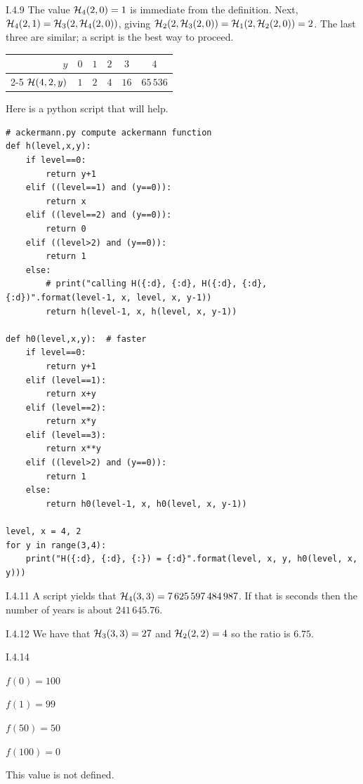 \begin{ans}{I.4.9}
The value $\mathcal{H}_4(2,0)=1$ is immediate from the
definition.
Next, $\mathcal{H}_4(2,1)=\mathcal{H}_3(2,\mathcal{H}_4(2,0))$,
giving $\mathcal{H}_2(2,\mathcal{H}_3(2,0))=\mathcal{H}_1(2,\mathcal{H}_2(2,0))=2$.
The last three are similar; a script is the best way to proceed.
\begin{center}
\begin{tabular}{r|ccccc}
  $y$                       &$0$  &$1$  &$2$  &$3$   &$4$ \\  \cline{2-5}
  $\mathcal{H}(4,2,y)$ &$1$  &$2$  &$4$  &$16$  &$65\,536$
\end{tabular}
\end{center}
Here is a python script that will help.
\begin{lstlisting}
# ackermann.py compute ackermann function
def h(level,x,y):
    if level==0:
        return y+1
    elif ((level==1) and (y==0)):
        return x
    elif ((level==2) and (y==0)):
        return 0
    elif ((level>2) and (y==0)):
        return 1
    else:
        # print("calling H({:d}, {:d}, H({:d}, {:d}, {:d})".format(level-1, x, level, x, y-1))
        return h(level-1, x, h(level, x, y-1))

def h0(level,x,y):  # faster
    if level==0:
        return y+1
    elif (level==1):
        return x+y
    elif (level==2):
        return x*y
    elif (level==3):
        return x**y
    elif ((level>2) and (y==0)):
        return 1
    else:
        return h0(level-1, x, h0(level, x, y-1))

level, x = 4, 2
for y in range(3,4):
    print("H({:d}, {:d}, {:}) = {:d}".format(level, x, y, h0(level, x, y)))
\end{lstlisting}
\end{ans}
%
%
\begin{ans}{I.4.11}
A script yields that $\mathcal{H}_4(3,3)=7\,625\,597\,484\,987$.
If that is seconds then the number of years is about $241\,645.76$.
\end{ans}
%
\begin{ans}{I.4.12}
We have that $\mathcal{H}_3(3,3)=27$ and
$\mathcal{H}_2(2,2)=4$ so the ratio is $6.75$.
\end{ans}
%
%
\begin{ans}{I.4.14}
\begin{exparts}
\item $f(0)=100$
\item $f(1)=99$
\item $f(50)=50$
\item $f(100)=0$
\item This value is not defined.
\end{exparts}
\end{ans}
